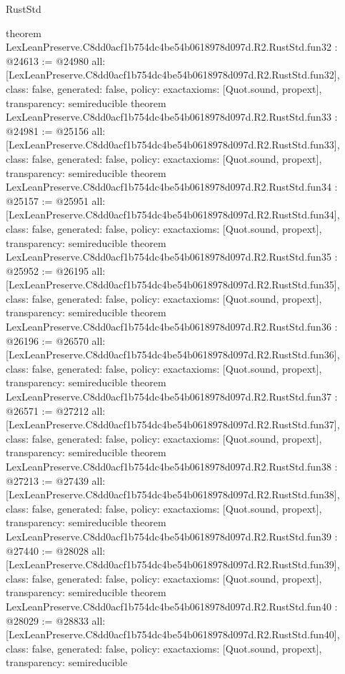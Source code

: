 \begin{lexlean}{RustStd}
\begin{coremodule}
{}
theorem LexLeanPreserve.C8dd0acf1b754dc4be54b0618978d097d.R2.RustStd.fun32 : @24613 := @24980 {
  all: [LexLeanPreserve.C8dd0acf1b754dc4be54b0618978d097d.R2.RustStd.fun32],
  class: false,
  generated: false,
  policy: exact{axioms: [Quot.sound, propext]},
  transparency: semireducible
}
theorem LexLeanPreserve.C8dd0acf1b754dc4be54b0618978d097d.R2.RustStd.fun33 : @24981 := @25156 {
  all: [LexLeanPreserve.C8dd0acf1b754dc4be54b0618978d097d.R2.RustStd.fun33],
  class: false,
  generated: false,
  policy: exact{axioms: [Quot.sound, propext]},
  transparency: semireducible
}
theorem LexLeanPreserve.C8dd0acf1b754dc4be54b0618978d097d.R2.RustStd.fun34 : @25157 := @25951 {
  all: [LexLeanPreserve.C8dd0acf1b754dc4be54b0618978d097d.R2.RustStd.fun34],
  class: false,
  generated: false,
  policy: exact{axioms: [Quot.sound, propext]},
  transparency: semireducible
}
theorem LexLeanPreserve.C8dd0acf1b754dc4be54b0618978d097d.R2.RustStd.fun35 : @25952 := @26195 {
  all: [LexLeanPreserve.C8dd0acf1b754dc4be54b0618978d097d.R2.RustStd.fun35],
  class: false,
  generated: false,
  policy: exact{axioms: [Quot.sound, propext]},
  transparency: semireducible
}
theorem LexLeanPreserve.C8dd0acf1b754dc4be54b0618978d097d.R2.RustStd.fun36 : @26196 := @26570 {
  all: [LexLeanPreserve.C8dd0acf1b754dc4be54b0618978d097d.R2.RustStd.fun36],
  class: false,
  generated: false,
  policy: exact{axioms: [Quot.sound, propext]},
  transparency: semireducible
}
theorem LexLeanPreserve.C8dd0acf1b754dc4be54b0618978d097d.R2.RustStd.fun37 : @26571 := @27212 {
  all: [LexLeanPreserve.C8dd0acf1b754dc4be54b0618978d097d.R2.RustStd.fun37],
  class: false,
  generated: false,
  policy: exact{axioms: [Quot.sound, propext]},
  transparency: semireducible
}
theorem LexLeanPreserve.C8dd0acf1b754dc4be54b0618978d097d.R2.RustStd.fun38 : @27213 := @27439 {
  all: [LexLeanPreserve.C8dd0acf1b754dc4be54b0618978d097d.R2.RustStd.fun38],
  class: false,
  generated: false,
  policy: exact{axioms: [Quot.sound, propext]},
  transparency: semireducible
}
theorem LexLeanPreserve.C8dd0acf1b754dc4be54b0618978d097d.R2.RustStd.fun39 : @27440 := @28028 {
  all: [LexLeanPreserve.C8dd0acf1b754dc4be54b0618978d097d.R2.RustStd.fun39],
  class: false,
  generated: false,
  policy: exact{axioms: [Quot.sound, propext]},
  transparency: semireducible
}
theorem LexLeanPreserve.C8dd0acf1b754dc4be54b0618978d097d.R2.RustStd.fun40 : @28029 := @28833 {
  all: [LexLeanPreserve.C8dd0acf1b754dc4be54b0618978d097d.R2.RustStd.fun40],
  class: false,
  generated: false,
  policy: exact{axioms: [Quot.sound, propext]},
  transparency: semireducible
}
\end{coremodule}
\end{lexlean}
